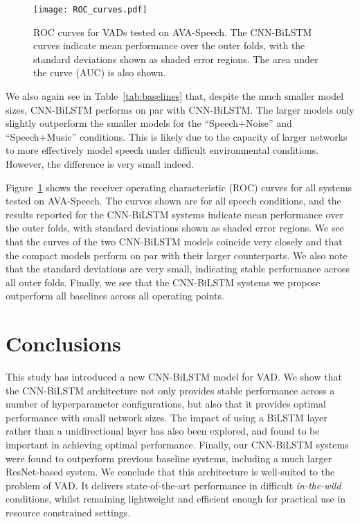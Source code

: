 \documentclass{article}
\begin{document}
\begin{figure}[htb]
\begin{minipage}[b]{1.0\linewidth}
  \centering
  \centerline{\texttt{[image: ROC\_curves.pdf]}}
\end{minipage}
\vspace{-6mm}
\caption{ROC curves for VADs tested on AVA-Speech. The CNN-BiLSTM curves indicate mean performance over the outer folds, with the standard deviations shown as shaded error regions. The area under the curve (AUC) is also shown.}
\label{fig:roc}
\vspace{-4mm}
\end{figure}

We also again see in \mbox{Table \ref{tab:baselines}} that, despite the much smaller model sizes, CNN-BiLSTM performs on par with CNN-BiLSTM.
The larger models only slightly outperform the smaller models for the ``Speech+Noise'' and ``Speech+Music'' conditions.
This is likely due to the capacity of larger networks to more effectively model speech under difficult environmental conditions.
However, the difference is very small indeed.

\mbox{Figure \ref{fig:roc}} shows the receiver operating characteristic (ROC) curves for all systems tested on AVA-Speech.
The curves shown are for all speech conditions, and the results reported for the CNN-BiLSTM systems indicate mean performance over the outer folds, with standard deviations shown as shaded error regions.
We see that the curves of the two CNN-BiLSTM models coincide very closely and that the compact models perform on par with their larger counterparts.
We also note that the standard deviations are very small, indicating stable performance across all outer folds.
Finally, we see that the CNN-BiLSTM systems we propose outperform all baselines across all operating points.

\vspace{-2mm}

\section{Conclusions}
\label{sec:conclusions}

\vspace{-2mm}

This study has introduced a new CNN-BiLSTM model for VAD.
We show that the CNN-BiLSTM architecture not only provides stable performance across a number of hyperparameter configurations, but also that it provides optimal performance with small network sizes.
The impact of using a \mbox{BiLSTM} layer rather than a unidirectional layer has also been explored, and found to be important in achieving optimal performance.
Finally, our CNN-BiLSTM systems were found to outperform previous baseline systems, including a much larger ResNet-based system.
We conclude that this architecture is well-suited to the problem of VAD.
It delivers state-of-the-art performance in difficult \textit{in-the-wild} conditions, whilst remaining lightweight and efficient enough for practical use in resource constrained settings.
\end{document}
